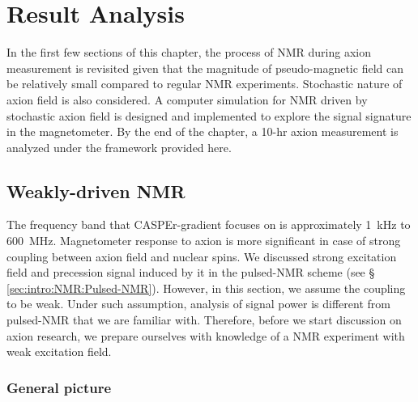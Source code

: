 \chapter{Result Analysis}

In the first few sections of this chapter, the process of NMR during axion measurement is revisited given that the magnitude of pseudo-magnetic field can be relatively small compared to regular NMR experiments. Stochastic nature of axion field is also considered. A computer simulation for NMR driven by stochastic axion field is designed and implemented to explore the signal signature in the magnetometer. By the end of the chapter, a 10-hr axion measurement is analyzed under the framework provided here. 

\section{Weakly-driven NMR}

The frequency band that CASPEr-gradient focuses on is approximately \SI{1}{\kHz} to \SI{600}{\MHz}. 
Magnetometer response to axion is more significant in case of strong coupling between axion field and nuclear spins. We discussed strong excitation field and precession signal induced by it in the pulsed-NMR scheme (see \S\,\ref{sec:intro:NMR:Pulsed-NMR}). 
However, in this section, we assume the coupling to be weak. Under such assumption, analysis of signal power is different from pulsed-NMR that we are familiar with. Therefore, before we start discussion on axion research, we prepare ourselves with knowledge of a NMR experiment with weak excitation field.

\subsection{General picture}

